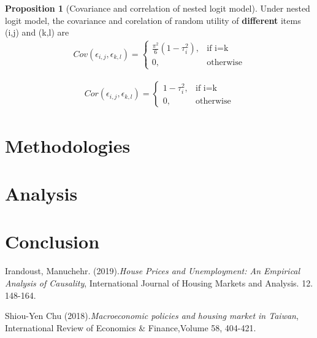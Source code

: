 \documentclass[12pt]{article}
\theoremstyle{definition}
\newtheorem{prop}[theorem]{Proposition}
\begin{document}
\begin{prop}[Covariance and correlation of nested logit model]\label{prop:3}
    Under nested logit model, the covariance and corelation of random utility of \textbf{different} items (i,j) and (k,l) are
    \begin{align*}
        Cov(\epsilon_{i,j}, \epsilon_{k,l}) = 
        \begin{cases}
            \frac{\pi^2}{6}(1-\tau_i^2), & \text{if i=k} \\
            0, & \text{otherwise}
        \end{cases}
    \end{align*}

    \begin{align*}
        Cor(\epsilon_{i,j}, \epsilon_{k,l}) =
        \begin{cases}
            1-\tau_i^2, & \text{if i=k} \\
            0, & \text{otherwise}
        \end{cases}
    \end{align*}
\end{prop}

\section{Methodologies}


\section{Analysis}

\section{Conclusion}

\begin{thebibliography}{1}
    Irandoust, Manuchehr. (2019).\emph{House Prices and Unemployment: An Empirical Analysis of Causality},
    International Journal of Housing Markets and Analysis. 12. 148-164. 

    Shiou-Yen Chu (2018).\emph{Macroeconomic policies and housing market in Taiwan},
    International Review of Economics \& Finance,Volume 58, 404-421.
\end{thebibliography}
\end{document}
